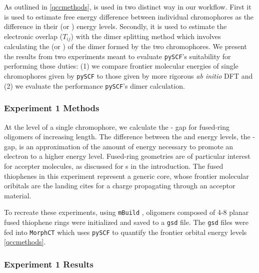 As outlined in \autoref{qccmethods},  is used in two distinct way in our workflow. 
First it is used to estimate free energy
difference between individual chromophores as the difference in their  (or ) energy levels.
Secondly, it is used to estimate the electronic overlap ($T_{ij}$) with the dimer splitting method which involves
calculating the  (or ) of the dimer formed by the two chromophores. We present the results from two
experiments meant to evaluate \texttt{pySCF}'s suitability for performing these duties:
(1) we compare frontier molecular energies of single chromophores given by \texttt{pySCF} to those
given by more rigorous \textit{ab initio} DFT and (2) we evaluate the performance \texttt{pySCF}'s dimer calculation.

\subsubsection{Experiment 1 Methods}

At the level of a single chromophore, we calculate the - gap for fused-ring
oligomers of increasing length. 
The difference between the  and  energy levels, the - gap, is an approximation of the amount
of energy necessary to promote an electron to a higher energy level.  
Fused-ring geometries are of particular interest for accepter
molecules, as discussed for s in the introduction. 
The fused thiophenes in this experiment represent a generic  core, whose frontier molecular oribitals are
the landing cites for a charge propagating through an acceptor material. 

To recreate these experiments, using \texttt{mBuild} \cite{Klein2016}, oligomers composed of 4-8 planar fused thiophene rings
were initialized and saved to a \texttt{gsd} file. The \texttt{gsd} files were fed into \texttt{MorphCT} which uses \texttt{pySCF} to quantify the
frontier orbital energy levels \autoref{qccmethods}.

\subsubsection{Experiment 1 Results}

